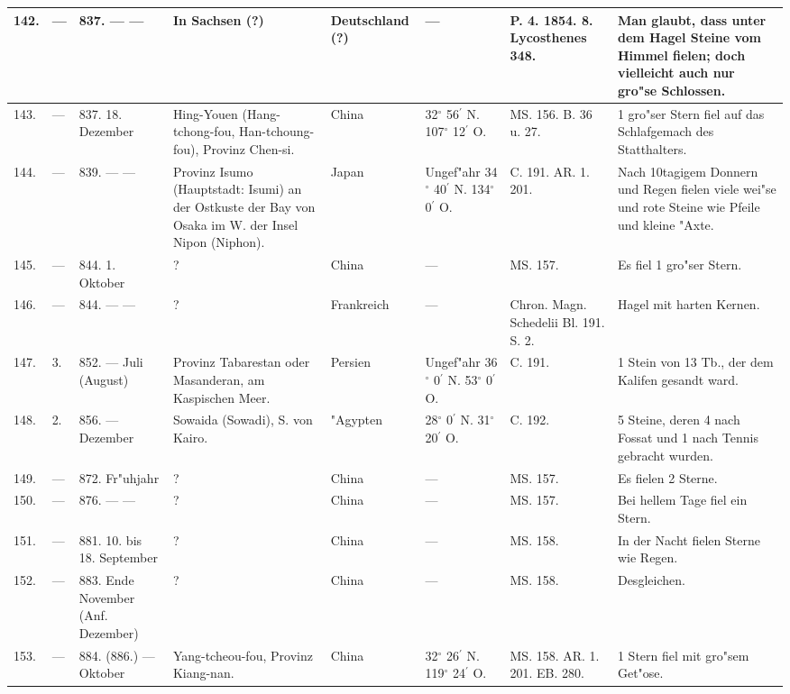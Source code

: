 \documentclass[a4paper, 8pt, oneside, polutonikogreek, german]{article}
\begin{document}
\begin{center}
\begin{longtable}{| p{5mm} | p{3mm} | p{15mm} | p{25mm} | p{20mm} | p{14mm} | p{17mm} | p{24mm} |}
        142. & --- & 837. --- --- & In Sachsen (?) & Deutschland (?) & --- & P. 4. 1854. 8. Lycosthenes 348. & Man glaubt, dass unter dem Hagel Steine vom Himmel fielen; doch vielleicht auch nur gro"se Schlossen. \\ \hline
        143. & --- & 837. 18. Dezember & Hing-Youen (Hang-tchong-fou, Han-tchoung-fou), Provinz Chen-si. & China & 32$^\circ$ 56$^\prime$ N. 107$^\circ$ 12$^\prime$ O. & MS. 156. B. 36 u. 27. & 1 gro"ser Stern fiel auf das Schlafgemach des Statthalters. \\ \hline
        144. & --- & 839. --- --- & Provinz Isumo (Hauptstadt: Isumi) an der Ostkuste der Bay von Osaka im W. der Insel Nipon (Niphon). & Japan & Ungef"ahr 34$^\circ$ 40$^\prime$ N. 134$^\circ$ 0$^\prime$ O. & C. 191. AR. 1. 201. & Nach 10tagigem Donnern und Regen fielen viele wei"se und rote Steine wie Pfeile und kleine "Axte. \\ \hline
        145. & --- & 844. 1. Oktober & ? & China & --- & MS. 157. & Es fiel 1 gro"ser Stern. \\ \hline
        146. & --- & 844. --- --- & ? & Frankreich & --- & Chron. Magn. Schedelii Bl. 191. S. 2. & Hagel mit harten Kernen. \\ \hline
        147. & 3. & 852. --- Juli (August) & Provinz Tabarestan oder Masanderan, am Kaspischen Meer. & Persien & Ungef"ahr 36$^\circ$ 0$^\prime$ N. 53$^\circ$ 0$^\prime$ O. & C. 191. & 1 Stein von 13 Tb., der dem Kalifen gesandt ward. \\ \hline
        148. & 2. & 856. --- Dezember & Sowaida (Sowadi), S. von Kairo. & "Agypten & 28$^\circ$ 0$^\prime$ N. 31$^\circ$ 20$^\prime$ O. & C. 192. & 5 Steine, deren 4 nach Fossat und 1 nach Tennis gebracht wurden. \\ \hline
        149. & --- & 872. Fr"uhjahr & ? & China & --- & MS. 157. & Es fielen 2 Sterne. \\ \hline
        150. & --- & 876. --- --- & ? & China & --- & MS. 157. & Bei hellem Tage fiel ein Stern. \\ \hline
        151. & --- & 881. 10. bis 18. September & ? & China & --- & MS. 158. & In der Nacht fielen Sterne wie Regen. \\ \hline
        152. & --- & 883. Ende November (Anf. Dezember) & ? & China & --- & MS. 158. & Desgleichen. \\ \hline
        153. & --- & 884. (886.) --- Oktober & Yang-tcheou-fou, Provinz Kiang-nan. & China & 32$^\circ$ 26$^\prime$ N. 119$^\circ$ 24$^\prime$ O. & MS. 158. AR. 1. 201. EB. 280. & 1 Stern fiel mit gro"sem Get"ose. \\ \hline

\end{longtable}
\end{center}
\end{document}
